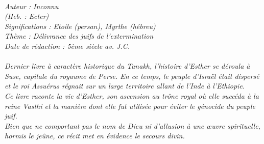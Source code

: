\BFont
\noindent\hrulefill
{\footnotesize
\textit{
\bigskip
{\centering{}
\\Auteur : Inconnu
\\(Heb. : Ecter)
\\Significations : Etoile (persan), Myrthe (hébreu)
\\Thème : Délivrance des juifs de l’extermination
\\Date de rédaction : 5ème siècle av. J.C.\\}
}
\textit{
\\Dernier livre à caractère historique du Tanakh, l’histoire d’Esther se déroula à Suse, capitale du royaume de Perse. En ce temps, le peuple d’Israël était dispersé et le roi Assuérus régnait sur un large territoire allant de l’Inde à l'Ethiopie.
\\Ce livre raconte la vie d’Esther, son ascension au trône royal où elle succéda à la reine Vasthi et la manière dont elle fut utilisée pour éviter le génocide du peuple juif.  
\\Bien que ne comportant pas le nom de Dieu ni d’allusion à une œuvre spirituelle, hormis le jeûne, ce récit met en évidence le secours divin.\bigskip
}
}
\par\nobreak\noindent\hrulefill
